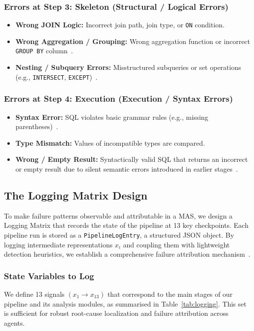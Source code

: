\documentclass[conference]{IEEEtran}
\begin{document}
\subsubsection{Errors at Step 3: Skeleton (Structural / Logical Errors)}
\begin{itemize}
  \item \textbf{Wrong JOIN Logic:} Incorrect join path, join type, or
  \texttt{ON} condition.
  \item \textbf{Wrong Aggregation / Grouping:} Wrong aggregation function or
  incorrect \texttt{GROUP BY} column~\cite{shen_icl_errors_2026}.
  \item \textbf{Nesting / Subquery Errors:} Misstructured subqueries or set
  operations (e.g., \texttt{INTERSECT},
  \texttt{EXCEPT})~\cite{chen_error_detection_2023}.
\end{itemize}

\subsubsection{Errors at Step 4: Execution (Execution / Syntax Errors)}
\begin{itemize}
  \item \textbf{Syntax Error:} SQL violates basic grammar rules (e.g.,
  missing parentheses)~\cite{lei_emlc_2026}.
  \item \textbf{Type Mismatch:} Values of incompatible types are compared.
  \item \textbf{Wrong / Empty Result:} Syntactically valid SQL that returns
  an incorrect or empty result due to silent semantic errors introduced in
  earlier stages~\cite{shen_icl_errors_2026}.
\end{itemize}

\subsection{The Logging Matrix Design}
To make failure patterns observable and attributable in a MAS, we design a
Logging Matrix that records the state of the pipeline at 13 key checkpoints.
Each pipeline run is stored as a \texttt{PipelineLogEntry}, a structured JSON
object. By logging intermediate representations $x_i$ and coupling them with
lightweight detection heuristics, we establish a comprehensive failure
attribution mechanism~\cite{zhang2025which}.

\subsubsection{State Variables to Log}
We define 13 signals $(x_1 \to x_{13})$ that correspond to the main stages
of our pipeline and its analysis modules, as summarised in
Table~\ref{tab:logging}. This set is sufficient for robust
root-cause localization and failure attribution across agents.
\end{document}
